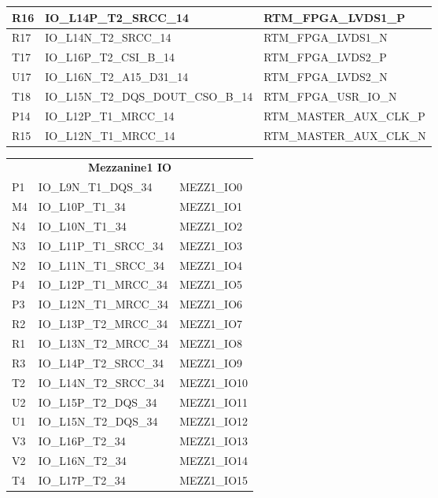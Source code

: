 \begin{footnotesize}
\begin{longtable}{|l|p{6cm}|p{6cm}|}
	R16	&	IO\_L14P\_T2\_SRCC\_14	&	RTM\_FPGA\_LVDS1\_P	\\ \hline
	R17	&	IO\_L14N\_T2\_SRCC\_14	&	RTM\_FPGA\_LVDS1\_N	\\ \hline
	T17	&	IO\_L16P\_T2\_CSI\_B\_14	&	RTM\_FPGA\_LVDS2\_P	\\ \hline
	U17	&	IO\_L16N\_T2\_A15\_D31\_14	&	RTM\_FPGA\_LVDS2\_N	\\ \hline
	T18	&	IO\_L15N\_T2\_DQS\_DOUT\_CSO\_B\_14	&	RTM\_FPGA\_USR\_IO\_N	\\ \hline
	P14	&	IO\_L12P\_T1\_MRCC\_14	&	RTM\_MASTER\_AUX\_CLK\_P	\\ \hline
	R15	&	IO\_L12N\_T1\_MRCC\_14	&	RTM\_MASTER\_AUX\_CLK\_N	\\ \hline
	
		
	\end{longtable}
\end{footnotesize}

\begin{footnotesize}
	\begin{longtable}{|l|p{6cm}|p{6cm}|}
		\hline
		\multicolumn{3}{|c|}{\multirow{2}{*}{\textbf{\large{Mezzanine1 IO}}}}\\
		\multicolumn{3}{|c|}{} \\ \hline 
P1	&	IO\_L9N\_T1\_DQS\_34	&	MEZZ1\_IO0	\\ \hline
M4	&	IO\_L10P\_T1\_34	&	MEZZ1\_IO1	\\ \hline
N4	&	IO\_L10N\_T1\_34	&	MEZZ1\_IO2	\\ \hline
N3	&	IO\_L11P\_T1\_SRCC\_34	&	MEZZ1\_IO3	\\ \hline
N2	&	IO\_L11N\_T1\_SRCC\_34	&	MEZZ1\_IO4	\\ \hline
P4	&	IO\_L12P\_T1\_MRCC\_34	&	MEZZ1\_IO5	\\ \hline
P3	&	IO\_L12N\_T1\_MRCC\_34	&	MEZZ1\_IO6	\\ \hline
R2	&	IO\_L13P\_T2\_MRCC\_34	&	MEZZ1\_IO7	\\ \hline
R1	&	IO\_L13N\_T2\_MRCC\_34	&	MEZZ1\_IO8	\\ \hline
R3	&	IO\_L14P\_T2\_SRCC\_34	&	MEZZ1\_IO9	\\ \hline
T2	&	IO\_L14N\_T2\_SRCC\_34	&	MEZZ1\_IO10	\\ \hline
U2	&	IO\_L15P\_T2\_DQS\_34	&	MEZZ1\_IO11	\\ \hline
U1	&	IO\_L15N\_T2\_DQS\_34	&	MEZZ1\_IO12	\\ \hline
V3	&	IO\_L16P\_T2\_34	&	MEZZ1\_IO13	\\ \hline
V2	&	IO\_L16N\_T2\_34	&	MEZZ1\_IO14	\\ \hline
T4	&	IO\_L17P\_T2\_34	&	MEZZ1\_IO15	\\ \hline
	
	\end{longtable}
\end{footnotesize}

